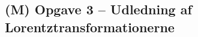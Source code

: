 \documentclass[../main.tex]{subfiles}
\begin{document}






\subsection{(M) Opgave 3 -- Udledning af Lorentztransformationerne}
\setcounter{subsection}{3}
\setcounter{equation}{0}
\end{document}
